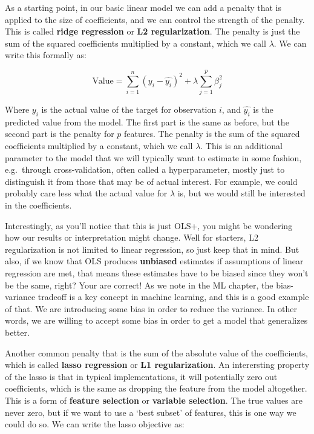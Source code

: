 \documentclass[
  letterpaper,
]{krantz}
\begin{document}
As a starting point, in our basic linear model we can add a penalty that
is applied to the size of coefficients, and we can control the strength
of the penalty. This is called \textbf{ridge regression} or \textbf{L2
regularization}. The penalty is just the sum of the squared coefficients
multiplied by a constant, which we call \(\lambda\). We can write this
formally as:

\[
\textrm{Value} = \sum_{i=1}^{n} (y_i - \hat{y_i})^2 + \lambda \sum_{j=1}^{p} \beta_j^2
\]

Where \(y_i\) is the actual value of the target for observation \(i\),
and \(\hat{y_i}\) is the predicted value from the model. The first part
is the same as before, but the second part is the penalty for \(p\)
features. The penalty is the sum of the squared coefficients multiplied
by a constant, which we call \(\lambda\). This is an additional
parameter to the model that we will typically want to estimate in some
fashion, e.g.~through cross-validation, often called a hyperparameter,
mostly just to distinguish it from those that may be of actual interest.
For example, we could probably care less what the actual value for
\(\lambda\) is, but we would still be interested in the coefficients.

Interestingly, as you'll notice that this is just OLS+, you might be
wondering how our results or interpretation might change. Well for
starters, L2 regularization is not limited to linear regression, so just
keep that in mind. But also, if we know that OLS produces
\textbf{unbiased} estimates if assumptions of linear regression are met,
that means these estimates have to be biased since they won't be the
same, right? Your are correct! As we note in the ML chapter, the
bias-variance tradeoff is a key concept in machine learning, and this is
a good example of that. We are introducing some bias in order to reduce
the variance. In other words, we are willing to accept some bias in
order to get a model that generalizes better.

Another common penalty that is the sum of the absolute value of the
coefficients, which is called \textbf{lasso regression} or \textbf{L1
regularization}. An interersting property of the lasso is that in
typical implementations, it will potentially zero out coefficients,
which is the same as dropping the feature from the model altogether.
This is a form of \textbf{feature selection} or \textbf{variable
selection}. The true values are never zero, but if we want to use a
`best subset' of features, this is one way we could do so. We can write
the lasso objective as:
\end{document}
